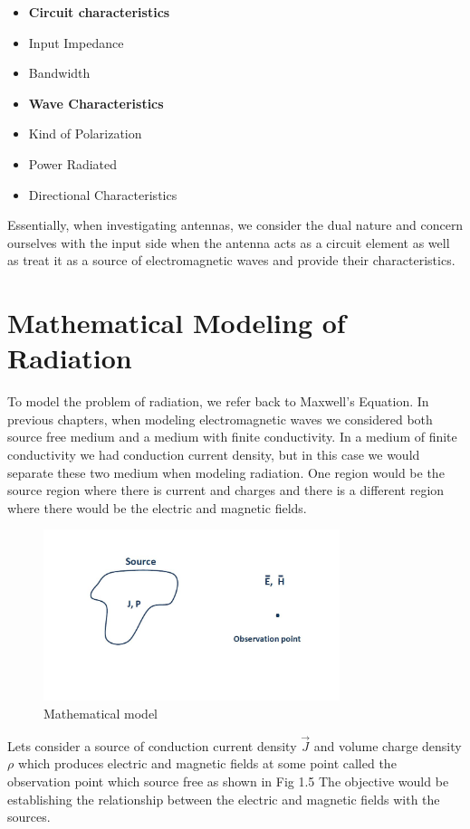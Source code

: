 \begin{itemize}
\item \textbf{Circuit characteristics}
\item Input Impedance
\item Bandwidth
\end{itemize}

\begin{itemize}
\item \textbf{Wave Characteristics}
\item Kind of Polarization
\item Power Radiated
\item Directional Characteristics
\end{itemize}
Essentially, when investigating antennas, we consider the dual nature and concern ourselves with the input side when the antenna acts as a circuit element as well as treat it as a source of electromagnetic waves and provide their characteristics. 

\section{Mathematical Modeling of Radiation}
To model the problem of radiation, we refer back to Maxwell's Equation. In previous chapters, when modeling electromagnetic waves we considered both source free medium and a medium with finite conductivity. In a medium of finite conductivity we had conduction current density, but in this case we would separate these two medium when modeling radiation. One region would be the source region where there is current and charges and there is a different region where there would be the electric and magnetic fields.
\begin{figure}
\centering
\includegraphics[height=5cm]{./graphics/fig_4}
\caption{Mathematical model}
\end{figure}

Lets consider a source of conduction current density $\vec{J}$ and volume charge density $\rho$ which produces electric and magnetic fields at some point called the observation point which source free as shown in Fig 1.5 The objective would be establishing the relationship between the electric and magnetic fields with the sources.

